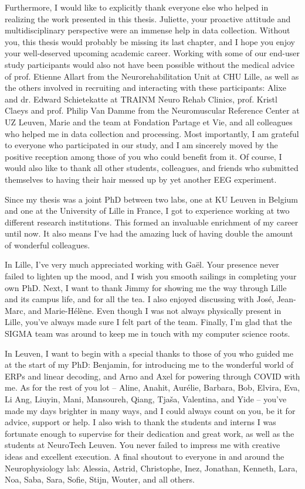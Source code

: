 Furthermore, I would like to explicitly thank everyone else who helped
in realizing the work presented in this thesis. Juliette, your
proactive attitude and multidisciplinary perspective were an immense help in
data collection. Without you, this thesis would probably be missing its
last chapter, and I hope you enjoy your well-deserved upcoming academic
career.
Working with some of our end-user study participants would also
not have been possible without the medical advice of prof. Etienne
Allart from the Neurorehabilitation Unit at CHU Lille, as well as
the others involved in recruiting and interacting with
these participants: Alixe and dr. Edward Schietekatte at TRAINM Neuro
Rehab Clinics, prof. Kristl Claeys and prof. Philip Van Damme from the
Neuromuscular Reference Center at UZ Leuven, Marie and the team at
Fondation Partage et Vie, and all colleagues who helped me in data
collection and processing. Most importantly, I am grateful to everyone
who participated in our study, and I am sincerely moved by the positive
reception among those of you who could benefit from it. Of course, I
would also like to thank all other students, colleagues, and friends who
submitted themselves to having their hair messed up by yet another EEG
experiment.

Since my thesis was a joint PhD between two labs, one at KU Leuven in
Belgium and one at the University of Lille in France, I got to
experience working at two different research institutions.
This formed an invaluable enrichment of my career until now.
It also means I've had the amazing luck of having double the amount of wonderful
colleagues.

In Lille, I've very much appreciated working with Gaël. Your presence
never failed to lighten up the mood, and I wish you smooth sailings
in completing your own PhD. Next, I want to thank Jimmy for showing
me the way through Lille and its campus life, and for all the tea. I
also enjoyed discussing with José, Jean-Marc, and Marie-Hélène.
Even though I was not always physically
present in Lille, you've always made sure I felt part of the team.
Finally, I'm glad that the SIGMA team was around to keep me in touch with
my computer science roots.

In Leuven, I want to begin with a special thanks to those of you who
guided me at the start of my PhD: Benjamin, for introducing me to
the wonderful world of ERPs and linear decoding, and Arno and Axel for
powering through COVID with me. As for the rest of you lot -- Aline,
Anahit, Aurélie, Barbara, Bob, Elvira, Eva, Li Ang, Liuyin, Mani, Mansoureh,
Qiang, Tjaša, Valentina, and Yide -- you've made my days brighter in many ways,
and I could always count on you, be it for advice, support or help.
I also wish to thank the students and interns I was fortunate enough to
supervise for their dedication and great work, as well as the students at NeuroTech Leuven.
You never failed to impress me with creative ideas and excellent
execution. A final shoutout to everyone in and around the
Neurophysiology lab: Alessia, Astrid, Christophe, Inez, Jonathan,
Kenneth, Lara, Noa, Saba, Sara, Sofie, Stijn, Wouter, and all others.

